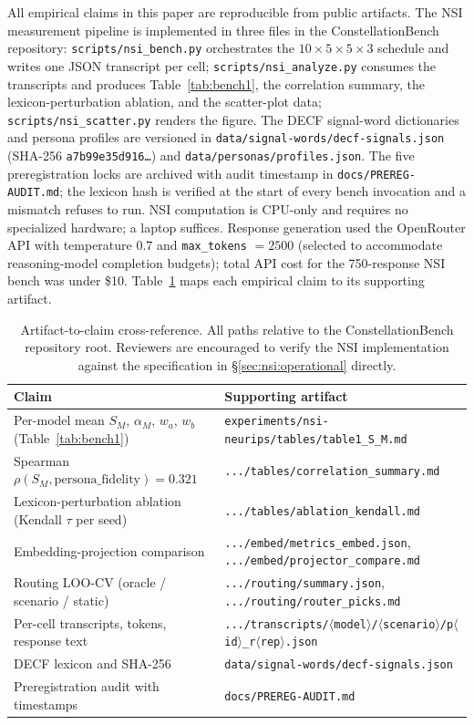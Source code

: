 \documentclass{article}
\begin{document}
All empirical claims in this paper are reproducible from public artifacts. The NSI measurement pipeline is implemented in three files in the ConstellationBench repository: \texttt{scripts/nsi\_bench.py} orchestrates the $10 \times 5 \times 5 \times 3$ schedule and writes one JSON transcript per cell; \texttt{scripts/nsi\_analyze.py} consumes the transcripts and produces Table~\ref{tab:bench1}, the correlation summary, the lexicon-perturbation ablation, and the scatter-plot data; \texttt{scripts/nsi\_scatter.py} renders the figure. The DECF signal-word dictionaries and persona profiles are versioned in \texttt{data/signal-words/decf-signals.json} (SHA-256 \texttt{a7b99e35d916\ldots}) and \texttt{data/personas/profiles.json}. The five preregistration locks are archived with audit timestamp in \texttt{docs/PREREG-AUDIT.md}; the lexicon hash is verified at the start of every bench invocation and a mismatch refuses to run. NSI computation is CPU-only and requires no specialized hardware; a laptop suffices. Response generation used the OpenRouter API with temperature $0.7$ and \texttt{max\_tokens} $= 2500$ (selected to accommodate reasoning-model completion budgets); total API cost for the 750-response NSI bench was under \$10. Table~\ref{tab:artifacts} maps each empirical claim to its supporting artifact.

\begin{table}[h]
\centering
\small
\begin{tabular}{ll}
\toprule
Claim & Supporting artifact \\
\midrule
Per-model mean $S_M$, $\alpha_M$, $w_a$, $w_b$ (Table~\ref{tab:bench1}) & \texttt{experiments/nsi-neurips/tables/table1\_S\_M.md} \\
Spearman $\rho(S_M, \mathrm{persona\_fidelity}) = 0.321$ & \texttt{.../tables/correlation\_summary.md} \\
Lexicon-perturbation ablation (Kendall $\tau$ per seed) & \texttt{.../tables/ablation\_kendall.md} \\
Embedding-projection comparison & \texttt{.../embed/metrics\_embed.json}, \texttt{.../embed/projector\_compare.md} \\
Routing LOO-CV (oracle / scenario / static) & \texttt{.../routing/summary.json}, \texttt{.../routing/router\_picks.md} \\
Per-cell transcripts, tokens, response text & \texttt{.../transcripts/$\langle$model$\rangle$/$\langle$scenario$\rangle$/p$\langle$id$\rangle$\_r$\langle$rep$\rangle$.json} \\
DECF lexicon and SHA-256 & \texttt{data/signal-words/decf-signals.json} \\
Preregistration audit with timestamps & \texttt{docs/PREREG-AUDIT.md} \\
\bottomrule
\end{tabular}
\caption{Artifact-to-claim cross-reference. All paths relative to the ConstellationBench repository root. Reviewers are encouraged to verify the NSI implementation against the specification in \S\ref{sec:nsi:operational} directly.}
\label{tab:artifacts}
\end{table}
\end{document}
